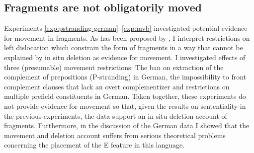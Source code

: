 \subsection{Fragments are not obligatorily moved}
Experiments \ref{exp:pstranding-german}--\ref{exp:mvb} investigated potential evidence for movement in fragments. As has been proposed by \citet{merchant2004}, I interpret restrictions on left dislocation which constrain the form of fragments in a way that cannot be explained by in situ deletion as evidence for movement. I investigated effects of three (presumable) movement restrictions: The ban on extraction of the complement of prepositions (P-stranding) in German, the impossibility to front complement clauses that lack an overt complementizer and restrictions on multiple prefield constituents in German. Taken together, these experiments do not provide evidence for movement so that, given the results on sententiality in the previous experiments, the data support an in situ deletion account of fragments. Furthermore, in the discussion of the German data I showed that the movement and deletion account suffers from serious theoretical problems concerning the placement of the E feature in this language.


